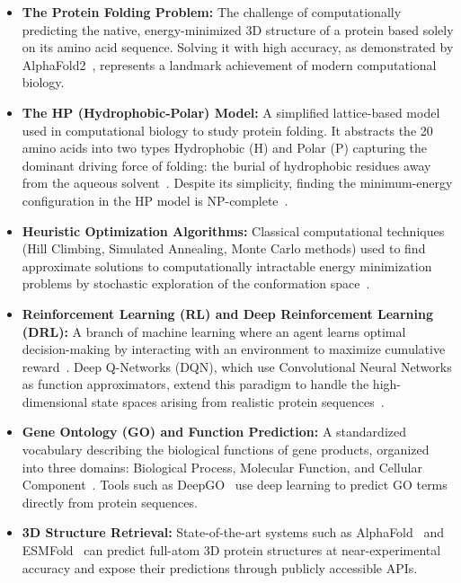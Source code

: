 \begin{itemize}
    \item \textbf{The Protein Folding Problem:} The challenge of computationally predicting the native, energy-minimized 3D structure of a protein based solely on its amino acid sequence. Solving it with high accuracy, as demonstrated by AlphaFold2~\cite{jumper2021highly}, represents a landmark achievement of modern computational biology.
    \item \textbf{The HP (Hydrophobic-Polar) Model:} A simplified lattice-based model used in computational biology to study protein folding. It abstracts the 20 amino acids into two types Hydrophobic (H) and Polar (P) capturing the dominant driving force of folding: the burial of hydrophobic residues away from the aqueous solvent~\cite{dill1985theory}. Despite its simplicity, finding the minimum-energy configuration in the HP model is NP-complete~\cite{crescenzi1998complexity}.
    \item \textbf{Heuristic Optimization Algorithms:} Classical computational techniques (Hill Climbing, Simulated Annealing, Monte Carlo methods) used to find approximate solutions to computationally intractable energy minimization problems by stochastic exploration of the conformation space~\cite{metropolis1953equation,kirkpatrick1983optimization,hukushima1996exchange}.
    \item \textbf{Reinforcement Learning (RL) and Deep Reinforcement Learning (DRL):} A branch of machine learning where an agent learns optimal decision-making by interacting with an environment to maximize cumulative reward~\cite{sutton2018reinforcement,watkins1992qlearning}. Deep Q-Networks (DQN), which use Convolutional Neural Networks as function approximators, extend this paradigm to handle the high-dimensional state spaces arising from realistic protein sequences~\cite{mnih2015human}.
    \item \textbf{Gene Ontology (GO) and Function Prediction:} A standardized vocabulary describing the biological functions of gene products, organized into three domains: Biological Process, Molecular Function, and Cellular Component~\cite{ashburner2000gene}. Tools such as DeepGO~\cite{kulmanov2018deepgo} use deep learning to predict GO terms directly from protein sequences.
    \item \textbf{3D Structure Retrieval:} State-of-the-art systems such as AlphaFold~\cite{jumper2021highly} and ESMFold~\cite{lin2023evolutionary} can predict full-atom 3D protein structures at near-experimental accuracy and expose their predictions through publicly accessible APIs.
\end{itemize}

